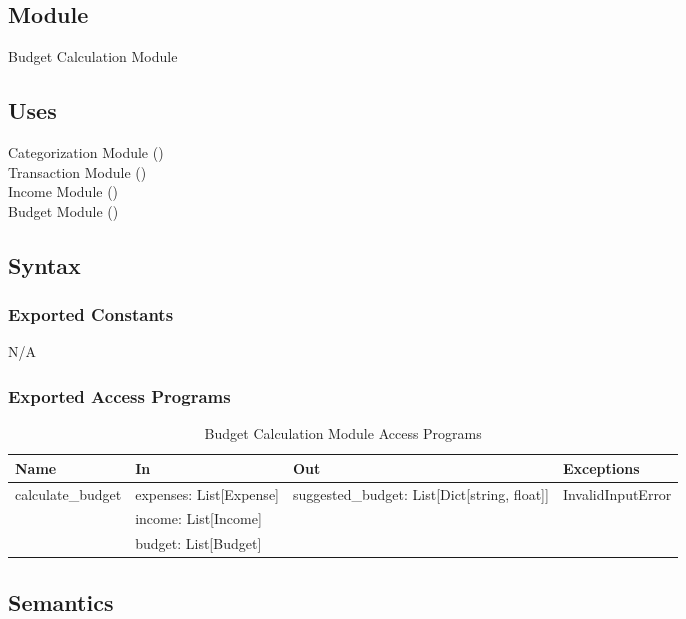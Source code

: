 \documentclass[12pt, titlepage]{article}
\begin{document}
\subsection{Module}

Budget Calculation Module

\subsection{Uses}
Categorization Module ()\\
Transaction Module ()\\
Income Module ()\\
Budget Module ()\\

\subsection{Syntax}

\subsubsection{Exported Constants}
N/A

\subsubsection{Exported Access Programs}

\begin{center}
\begin{table}[H]
  \caption{Budget Calculation Module Access Programs}
\begin{tabular}{p{4cm} p{4cm} p{4cm} p{4cm}}
\hline
\textbf{Name} & \textbf{In} & \textbf{Out} & \textbf{Exceptions} \\
\hline
calculate\_budget & expenses: List[Expense] & suggested\_budget: List[Dict[string, float]]
& InvalidInputError \\
& income: List[Income] & &  \\
& budget: List[Budget] & &  \\
\hline
\end{tabular}
\end{table}
\end{center}

\subsection{Semantics}
\end{document}
